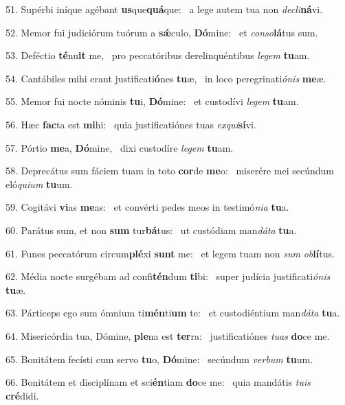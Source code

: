 51. Supérbi iníque agébant \textbf{us}que\textbf{quá}que: \ast\  a lege autem tua non \textit{de}\textit{cli}\textbf{ná}vi.\

52. Memor fui judiciórum tuórum a \textbf{sǽ}culo, \textbf{Dó}mine: \ast\  et \textit{con}\textit{so}\textbf{lá}tus sum.\

53. Deféctio \textbf{té}nu\textbf{it} me, \ast\  pro peccatóribus derelinquéntibus \textit{le}\textit{gem} \textbf{tu}am.\

54. Cantábiles mihi erant justificati\textbf{ó}nes \textbf{tu}æ, \ast\  in loco peregrinati\textit{ó}\textit{nis} \textbf{me}æ.\

55. Memor fui nocte nóminis \textbf{tu}i, \textbf{Dó}mine: \ast\  et custodívi \textit{le}\textit{gem} \textbf{tu}am.\

56. Hæc \textbf{fac}ta est \textbf{mi}hi: \ast\  quia justificatiónes tuas \textit{ex}\textit{qui}\textbf{sí}vi.\

57. Pórtio \textbf{me}a, \textbf{Dó}mine, \ast\  dixi custodíre \textit{le}\textit{gem} \textbf{tu}am.\

58. Deprecátus sum fáciem tuam in toto \textbf{cor}de \textbf{me}o: \ast\  miserére mei secúndum eló\textit{qui}\textit{um} \textbf{tu}um.\

59. Cogitávi \textbf{vi}as \textbf{me}as: \ast\  et convérti pedes meos in testimó\textit{ni}\textit{a} \textbf{tu}a.\

60. Parátus sum, et non \textbf{sum} tur\textbf{bá}tus: \ast\  ut custódiam man\textit{dá}\textit{ta} \textbf{tu}a.\

61. Funes peccatórum circum\textbf{plé}xi \textbf{sunt} me: \ast\  et legem tuam non \textit{sum} \textit{ob}\textbf{lí}tus.\

62. Média nocte surgébam ad confi\textbf{tén}dum \textbf{ti}bi: \ast\  super judícia justificati\textit{ó}\textit{nis} \textbf{tu}æ.\

63. Párticeps ego sum ómnium ti\textbf{mén}ti\textbf{um} te: \ast\  et custodiéntium man\textit{dá}\textit{ta} \textbf{tu}a.\

64. Misericórdia tua, Dómine, \textbf{ple}na est \textbf{ter}ra: \ast\  justificatiónes \textit{tu}\textit{as} \textbf{do}ce me.\

65. Bonitátem fecísti cum servo \textbf{tu}o, \textbf{Dó}mine: \ast\  secúndum \textit{ver}\textit{bum} \textbf{tu}um.\

66. Bonitátem et disciplínam et sci\textbf{én}tiam \textbf{do}ce me: \ast\  quia mandátis \textit{tu}\textit{is} \textbf{cré}didi.\

